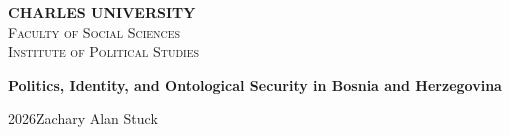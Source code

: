 \documentclass [a4paper,12pt]{report}
\def \BookName {Politics, Identity, and Ontological Security in Bosnia and Herzegovina}
\def \AutorDP {Zachary Alan Stuck}
\def \Year {2026}
\def \CUNI {CHARLES UNIVERSITY}
\def \FSS {Faculty of Social Sciences}
\def \IES {Institute of Political Studies}
\begin{document}
\pagestyle{empty}

    \begin{center}
    {\LARGE \textbf{\CUNI}}\\[2ex]
    {\LARGE \textsc{\FSS}}\\[1ex]
 	  {\large \textsc{\IES}}

		\vspace{8.47cm}
		
    {\Huge \textbf{\BookName} \\[4ex]

    }

    \vfill

    {\Large \Year \hfill \AutorDP}\\[6ex]

    \newpage
    \end{center}
\end{document}
